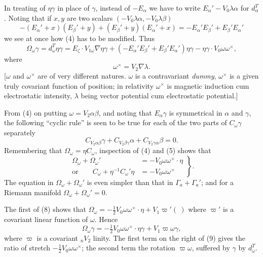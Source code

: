 \documentclass[11pt]{article}
\begin{document}
\indent In treating of $\eta\gamma$ in place of $\gamma$, instead of $-E_\alpha$ we have to write $E_\alpha'-V_0\lambda\alpha$ for $d_\alpha^T$. Noting that if $x,y$ are two scalars $(-V_0\lambda\alpha,-V_0\lambda\beta)$
\[
-(E_\alpha'+x)(E_\beta'+y)+(E_\beta'+y)(E_\alpha'+x)=-E_\alpha'E_\beta'+E_\beta'E_\alpha'
\]
we see at once how (4) has to be modified. Thus
\begin{equation}\Omega_\omega\gamma=d_\omega^T\eta\gamma=E_\zeta\mathbin{\cdot}V_{1\omega}\nabla\eta\gamma+(-E_\alpha'E_\beta'+E_\beta'E_\alpha')\eta\gamma-\eta\gamma\mathbin{\cdot}V_0\omega\omega^\times,\tag{5}\end{equation}
where
\begin{equation}\omega^\times=V_2\nabla\lambda.\tag{6}\end{equation}
[$\omega$ and $\omega^\times$ are of very different natures. $\omega$ is a contravariant \emph{dummy}, $\omega^\times$ is a given truly covariant function of position; in relativity $\omega^\times$ is magnetic induction cum electrostatic intensity, $\lambda$ being vector potential cum electrostatic potential.]

\indent From (4) on putting $\omega=V_2\alpha\beta$, and noting that $E_\alpha\gamma$ is symmetrical in $\alpha$ and $\gamma$, the following ``cyclic rule'' is seen to be true for each of the two parts of $C_\omega\gamma$ separately
\begin{equation}C_{V_2\alpha\beta}\gamma+C_{V_2\beta\gamma}\alpha+C_{V_2\gamma\alpha}\beta=0.\tag{7}\end{equation}
Remembering that $\Omega_\omega=\eta C_\omega$, inspection of (4) and (5) shows that
\begin{equation}
\left.\begin{aligned}
\Omega_\omega+\Omega_\omega'&=-V_0\omega\omega^\times\mathbin{\cdot}\eta\\
\text{or}\qquad C_\omega+\eta^{-1}C_\omega'\eta&=-V_0\omega\omega^\times
\end{aligned}\right\}.\tag{8}
\end{equation}
The equation in $\Omega_\omega+\Omega_\omega'$ is even simpler than that in $\Gamma_a+\Gamma_a'$; and for a Riemann manifold $\Omega_\omega+\Omega_\omega'=0$.

\indent The first of (8) shows that $\Omega_\omega=-\tfrac12V_0\omega\omega^\times\mathbin{\cdot}\eta+V_1\varpi'(\ )$ where $\varpi'$ is a covariant linear function of $\omega$. Hence
\begin{equation}\Omega_\omega\gamma=-\tfrac12V_0\omega\omega^\times\mathbin{\cdot}\eta\gamma+V_1\varpi\omega\gamma,\tag{9}\end{equation}
where $\varpi$ is a covariant ${}_nV_2$ linity. The first term on the right of (9) gives the ratio of stretch $-\tfrac12V_0\omega\omega^\times$; the second term the rotation $\varpi\omega$, suffered by $\gamma$ by $d_\omega^T$.
\end{document}
